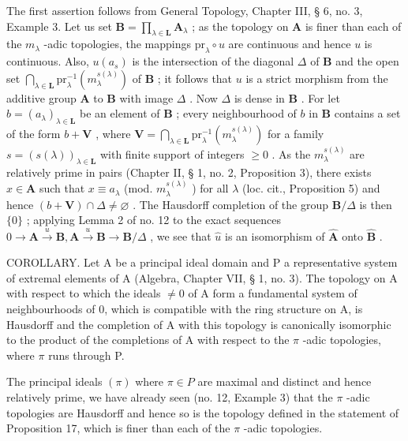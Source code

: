 The first assertion follows from General Topology, Chapter III, § 6, no. 3, Example 3. Let us set \(\mathbf{B} = \prod_{\lambda \in \mathbf{L}} \mathbf{A}_{\lambda}\) ; as the topology on \(\mathbf{A}\) is finer than each of the \(m_{\lambda}\) -adic topologies, the mappings \(\mathrm{pr}_{\lambda} \circ u\) are continuous and hence \(u\) is continuous. Also, \(u(a_s)\) is the intersection of the diagonal \(\Delta\) of \(\mathbf{B}\) and the open set \(\bigcap_{\lambda \in \mathbf{L}} \mathrm{pr}_{\lambda}^{-1}(m_{\lambda}^{s(\lambda)})\) of \(\mathbf{B}\) ; it follows that \(u\) is a strict morphism from the additive group \(\mathbf{A}\) to \(\mathbf{B}\) with image \(\Delta\) . Now \(\Delta\) is dense in \(\mathbf{B}\) . For let \(b = (a_{\lambda})_{\lambda \in \mathbf{L}}\) be an element of \(\mathbf{B}\) ; every neighbourhood of \(b\) in \(\mathbf{B}\) contains a set of the form \(b + \mathbf{V}\) , where \(\mathbf{V} = \bigcap_{\lambda \in \mathbf{L}} \mathrm{pr}_{\lambda}^{-1}(m_{\lambda}^{s(\lambda)})\) for a family \(s = (s(\lambda))_{\lambda \in \mathbf{L}}\) with finite support of integers \(\geqslant 0\) . As the \(m_{\lambda}^{s(\lambda)}\) are relatively prime in pairs (Chapter II, § 1, no. 2, Proposition 3), there exists \(x \in \mathbf{A}\) such that \(x \equiv a_{\lambda}\) (mod. \(m_{\lambda}^{s(\lambda)}\) ) for all \(\lambda\) (loc. cit., Proposition 5) and hence \((b + \mathbf{V}) \cap \Delta \neq \varnothing\) . The Hausdorff completion of the group \(\mathbf{B}/\Delta\) is then \(\{0\}\) ; applying Lemma 2 of no. 12 to the exact sequences \(0 \to \mathbf{A} \xrightarrow{u} \mathbf{B}, \mathbf{A} \xrightarrow{u} \mathbf{B} \to \mathbf{B}/\Delta\) , we see that \(\hat{u}\) is an isomorphism of \(\hat{\mathbf{A}}\) onto \(\hat{\mathbf{B}}\) .

COROLLARY. Let A be a principal ideal domain and P a representative system of extremal elements of A (Algebra, Chapter VII, § 1, no. 3). The topology on A with respect to which the ideals \(\neq0\) of A form a fundamental system of neighbourhoods of 0, which is compatible with the ring structure on A, is Hausdorff and the completion of A with this topology is canonically isomorphic to the product of the completions of A with respect to the \(\pi\) -adic topologies, where \(\pi\) runs through P.

The principal ideals \((\pi)\) where \(\pi \in P\) are maximal and distinct and hence relatively prime, we have already seen (no. 12, Example 3) that the \(\pi\) -adic topologies are Hausdorff and hence so is the topology defined in the statement of Proposition 17, which is finer than each of the \(\pi\) -adic topologies.

